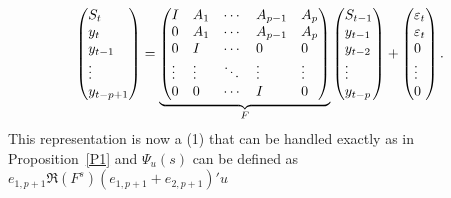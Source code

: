 \documentclass[12pt,fleqn]{article}
\begin{document}
\begin{equation*}
  \begin{pmatrix*}[l]
    S_t \\ y_t \\ y_{t-1} \\ \vdots \\ y_{t-p+1}
  \end{pmatrix*}
  =
  \underbrace{\begin{pmatrix*}[l]
    I      & A_1    & \cdots & A_{p-1} & A_p    \\
    0      & A_1    & \cdots & A_{p-1} & A_p    \\
    0      & I      & \cdots & 0       & 0      \\
    \vdots & \vdots & \ddots & \vdots  & \vdots \\
    0      & 0      & \cdots & I       & 0
  \end{pmatrix*}}_F
  \begin{pmatrix*}[l]
    S_{t-1}  \\ y_{t-1} \\ y_{t-2} \\ \vdots \\ y_{t-p}
  \end{pmatrix*}
  +
  \begin{pmatrix*}[l]
    \vep_t \\ \vep_t \\ 0 \\ \vdots \\ 0
  \end{pmatrix*}.
\end{equation*}
This representation is now a \VAR(1) that can be handled exactly as in
Proposition~\ref{P1} and $\Psi_u(s)$ can be defined as
$e_{1,p+1} \Re(F^s) (e_{1,p+1} + e_{2,p+1})' u$
\end{document}
